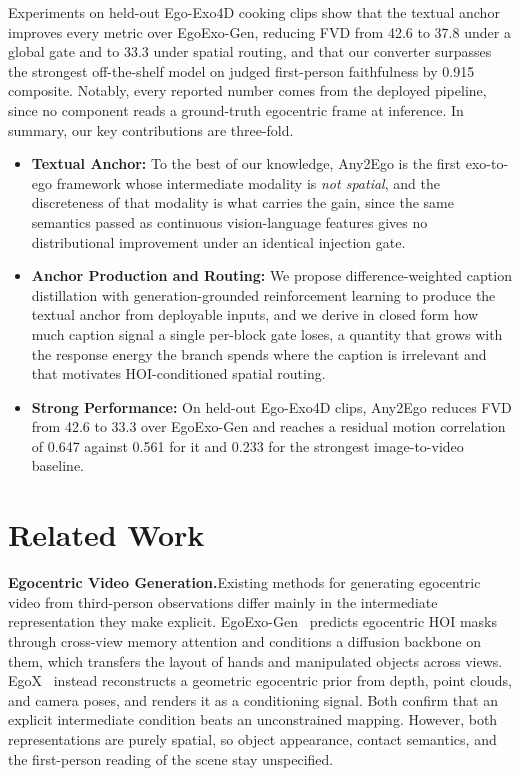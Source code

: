 \documentclass{article}
\begin{document}
Experiments on held-out Ego-Exo4D cooking clips show that the textual anchor
improves every metric over EgoExo-Gen, reducing FVD from 42.6 to 37.8 under a
global gate and to 33.3 under spatial routing, and that our converter surpasses the strongest off-the-shelf model on judged
first-person faithfulness by 0.915 composite. Notably, every reported number
comes from the deployed pipeline, since no component reads a ground-truth
egocentric frame at inference.
In summary, our key contributions are three-fold.
\begin{itemize}[leftmargin=1em, itemsep=-1ex, topsep=0ex]
    \item \textbf{Textual Anchor:} To the best of our knowledge, Any2Ego is
    the first exo-to-ego framework whose intermediate modality is \emph{not
    spatial}, and the discreteness of that modality is what carries the gain,
    since the same semantics passed as continuous vision-language features gives
    no distributional improvement under an identical injection gate.
    \item \textbf{Anchor Production and Routing:} We propose
    difference-weighted caption distillation with generation-grounded
    reinforcement learning to produce the textual anchor from deployable inputs,
    and we derive in closed form how much caption signal a single per-block gate
    loses, a quantity that grows with the response energy the branch spends where
    the caption is irrelevant and that motivates HOI-conditioned spatial routing.
    \item \textbf{Strong Performance:} On held-out Ego-Exo4D clips, Any2Ego
    reduces FVD from 42.6 to 33.3 over EgoExo-Gen and reaches a residual motion
    correlation of 0.647 against 0.561 for it and 0.233 for the strongest
    image-to-video baseline.
\end{itemize}

\section{Related Work}
\label{sec:related}

\textbf{Egocentric Video Generation.}\quad Existing methods for generating
egocentric video from third-person observations differ mainly in the
intermediate representation they make explicit.
EgoExo-Gen~\citep{xu2025egoexogen} predicts egocentric HOI masks through
cross-view memory attention and conditions a diffusion backbone on them, which
transfers the layout of hands and manipulated objects across views.
EgoX~\citep{kang2025egox} instead reconstructs a geometric egocentric prior
from depth, point clouds, and camera poses, and renders it as a conditioning
signal. Both confirm that an explicit intermediate condition beats an unconstrained
mapping. However, both representations are purely spatial, so object appearance,
contact semantics, and the first-person reading of the scene stay unspecified.
\end{document}

